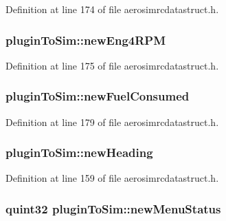 Definition at line 174 of file aerosimrcdatastruct.\-h.

\hypertarget{group___aero_sim_r_c_ga474540a6a0a35ece5e87974e07c99c87}{
\subsubsection[{new\-Eng4\-R\-P\-M}]{ plugin\-To\-Sim\-::new\-Eng4\-R\-P\-M}}\label{group___aero_sim_r_c_ga474540a6a0a35ece5e87974e07c99c87}


Definition at line 175 of file aerosimrcdatastruct.\-h.

\hypertarget{group___aero_sim_r_c_ga8a8341d7559a5dfa620a7c486f2dc023}{
\subsubsection[{new\-Fuel\-Consumed}]{ plugin\-To\-Sim\-::new\-Fuel\-Consumed}}\label{group___aero_sim_r_c_ga8a8341d7559a5dfa620a7c486f2dc023}


Definition at line 179 of file aerosimrcdatastruct.\-h.

\hypertarget{group___aero_sim_r_c_ga11677816070d9ac5bc78d2c45338c0ec}{
\subsubsection[{new\-Heading}]{ plugin\-To\-Sim\-::new\-Heading}}\label{group___aero_sim_r_c_ga11677816070d9ac5bc78d2c45338c0ec}


Definition at line 159 of file aerosimrcdatastruct.\-h.

\hypertarget{group___aero_sim_r_c_ga17602d21cacd40328f97406fb577e7a7}{
\subsubsection[{new\-Menu\-Status}]{\setlength{\rightskip}{0pt plus 5cm}quint32 plugin\-To\-Sim\-::new\-Menu\-Status}}\label{group___aero_sim_r_c_ga17602d21cacd40328f97406fb577e7a7}


